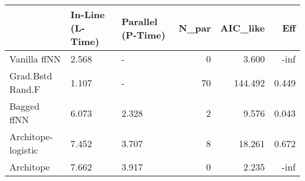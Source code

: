 \begin{tabular}{lllrrr}
\toprule
{} & In-Line (L-Time) & Parallel (P-Time) &  N\_par &  AIC\_like &    Eff \\
\midrule
Vanilla ffNN       &            2.568 &                 - &      0 &     3.600 &   -inf \\
Grad.Bstd Rand.F   &            1.107 &                 - &     70 &   144.492 &  0.449 \\
Bagged ffNN        &            6.073 &             2.328 &      2 &     9.576 &  0.043 \\
Architope-logistic &            7.452 &             3.707 &      8 &    18.261 &  0.672 \\
Architope          &            7.662 &             3.917 &      0 &     2.235 &   -inf \\
\bottomrule
\end{tabular}
